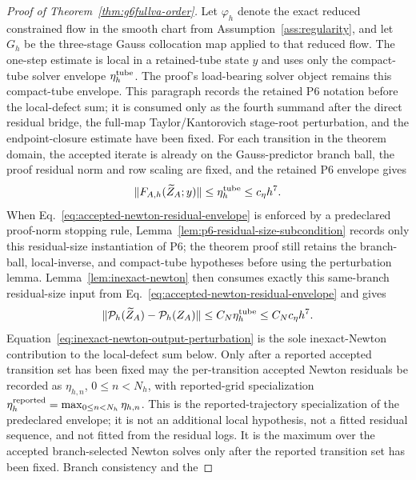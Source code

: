\documentclass[preprint,12pt]{elsarticle}
\begin{document}
\begin{proof}[Proof of Theorem~\ref{thm:g6fullva-order}]
Let $\varphi_h$ denote the exact reduced constrained flow in the smooth chart
from Assumption~\ref{ass:regularity}, and let $G_h$ be the three-stage Gauss
collocation map applied to that reduced flow. The one-step estimate is local
in a retained-tube state \(y\) and uses only the compact-tube solver envelope
\(\eta_h^{\rm tube}\).  The proof's load-bearing solver object remains this
compact-tube envelope.  This paragraph records the retained P6 notation before
the local-defect sum; it is consumed only as the fourth summand after the
direct residual bridge, the full-map Taylor/Kantorovich stage-root
perturbation, and the endpoint-closure estimate have been fixed.  For each
transition in the theorem domain, the
accepted iterate is already on the Gauss-predictor branch ball, the proof
residual norm and row scaling are fixed, and the retained P6 envelope gives
\begin{equation}
\label{eq:accepted-newton-residual-envelope}
  \|F_{A,h}(\widetilde Z_A;y)\|
  \le \eta_h^{\rm tube}\le c_\eta h^7 .
\end{equation}
When Eq.~\eqref{eq:accepted-newton-residual-envelope} is enforced by a
predeclared proof-norm stopping rule, Lemma~\ref{lem:p6-residual-size-subcondition}
records only this residual-size instantiation of P6; the theorem proof still
retains the branch-ball, local-inverse, and compact-tube hypotheses before
using the perturbation lemma.
Lemma~\ref{lem:inexact-newton} then consumes exactly this same-branch
residual-size input from Eq.~\eqref{eq:accepted-newton-residual-envelope} and
gives
\begin{equation}
\label{eq:inexact-newton-output-perturbation}
  \|\mathcal P_h(\widetilde Z_A)-\mathcal P_h(Z_A)\|
  \le C_N\eta_h^{\rm tube}\le C_Nc_\eta h^7 .
\end{equation}
Equation~\eqref{eq:inexact-newton-output-perturbation} is the sole
inexact-Newton contribution to the local-defect sum below.
Only after a reported accepted transition set has been fixed may the
per-transition accepted Newton residuals be recorded as
\(\eta_{h,n}\), \(0\le n<N_h\), with reported-grid specialization
\(\eta_h^{\rm reported}=\max_{0\le n<N_h}\eta_{h,n}\). This is the
reported-trajectory specialization of the predeclared envelope; it is not an additional local
hypothesis, not a fitted residual sequence, and not fitted from the residual
logs. It is the maximum over the accepted branch-selected Newton solves only
after the reported transition set has been fixed. Branch consistency and the

\end{proof}
\end{document}
